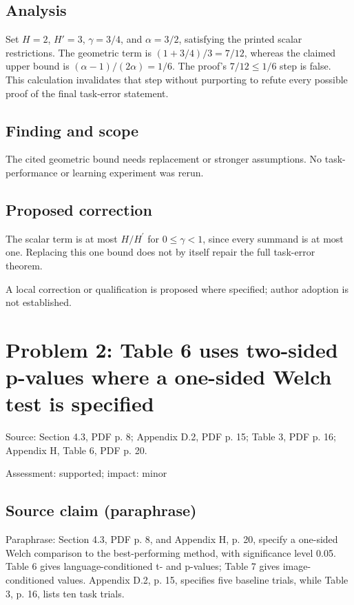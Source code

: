 \documentclass[11pt]{article}
\begin{document}
\subsection*{Analysis}

Set \(H=2\), \(H'=3\), \(\gamma=3/4\), and \(\alpha=3/2\), satisfying the printed scalar restrictions. The geometric term is \((1+3/4)/3=7/12\), whereas the claimed upper bound is \((\alpha-1)/(2\alpha)=1/6\). The proof's \(7/12\le1/6\) step is false. This calculation invalidates that step without purporting to refute every possible proof of the final task-error statement.

\subsection*{Finding and scope}

The cited geometric bound needs replacement or stronger assumptions. No task-performance or learning experiment was rerun.

\subsection*{Proposed correction}

The scalar term is at most \(H/H^{\prime}\) for \(0\le\gamma<1\), since every summand is at most one. Replacing this one bound does not by itself repair the full task-error theorem.

A local correction or qualification is proposed where specified; author adoption is not established.

\section*{Problem 2: Table 6 uses two-sided p-values where a one-sided Welch test is specified}

Source: Section 4.3, PDF p. 8; Appendix D.2, PDF p. 15; Table 3, PDF p. 16; Appendix H, Table 6, PDF p. 20.

Assessment: supported; impact: minor

\subsection*{Source claim (paraphrase)}

Paraphrase: Section 4.3, PDF p. 8, and Appendix H, p. 20, specify a one-sided Welch comparison to the best-performing method, with significance level 0.05. Table 6 gives language-conditioned t- and p-values; Table 7 gives image-conditioned values. Appendix D.2, p. 15, specifies five baseline trials, while Table 3, p. 16, lists ten task trials.
\end{document}
